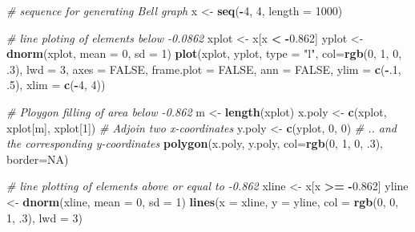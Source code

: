 \documentclass[]{article}
\newenvironment{Shaded}{\begin{snugshade}}{\end{snugshade}}
\newcommand{\KeywordTok}[1]{\textcolor[rgb]{0.13,0.29,0.53}{\textbf{#1}}}
\newcommand{\DataTypeTok}[1]{\textcolor[rgb]{0.13,0.29,0.53}{#1}}
\newcommand{\DecValTok}[1]{\textcolor[rgb]{0.00,0.00,0.81}{#1}}
\newcommand{\FloatTok}[1]{\textcolor[rgb]{0.00,0.00,0.81}{#1}}
\newcommand{\StringTok}[1]{\textcolor[rgb]{0.31,0.60,0.02}{#1}}
\newcommand{\CommentTok}[1]{\textcolor[rgb]{0.56,0.35,0.01}{\textit{#1}}}
\newcommand{\OtherTok}[1]{\textcolor[rgb]{0.56,0.35,0.01}{#1}}
\newcommand{\OperatorTok}[1]{\textcolor[rgb]{0.81,0.36,0.00}{\textbf{#1}}}
\newcommand{\NormalTok}[1]{#1}
\begin{document}
\begin{Shaded}
\begin{Highlighting}[]
\CommentTok{# sequence for generating Bell graph}
\NormalTok{x <-}\StringTok{ }\KeywordTok{seq}\NormalTok{(}\OperatorTok{-}\DecValTok{4}\NormalTok{, }\DecValTok{4}\NormalTok{, }\DataTypeTok{length =} \DecValTok{1000}\NormalTok{)}

\CommentTok{# line ploting of elements below -0.0862}
\NormalTok{xplot <-}\StringTok{ }\NormalTok{x[x }\OperatorTok{<}\StringTok{ }\OperatorTok{-}\FloatTok{0.862}\NormalTok{]}
\NormalTok{yplot <-}\StringTok{ }\KeywordTok{dnorm}\NormalTok{(xplot, }\DataTypeTok{mean =} \DecValTok{0}\NormalTok{, }\DataTypeTok{sd =} \DecValTok{1}\NormalTok{)}
\KeywordTok{plot}\NormalTok{(xplot, yplot, }\DataTypeTok{type =} \StringTok{"l"}\NormalTok{, }\DataTypeTok{col=}\KeywordTok{rgb}\NormalTok{(}\DecValTok{0}\NormalTok{, }\DecValTok{1}\NormalTok{, }\DecValTok{0}\NormalTok{, .}\DecValTok{3}\NormalTok{), }\DataTypeTok{lwd =} \DecValTok{3}\NormalTok{, }\DataTypeTok{axes =} \OtherTok{FALSE}\NormalTok{, }\DataTypeTok{frame.plot =} \OtherTok{FALSE}\NormalTok{, }\DataTypeTok{ann =} \OtherTok{FALSE}\NormalTok{, }\DataTypeTok{ylim =} \KeywordTok{c}\NormalTok{(}\OperatorTok{-}\NormalTok{.}\DecValTok{1}\NormalTok{, .}\DecValTok{5}\NormalTok{), }\DataTypeTok{xlim =} \KeywordTok{c}\NormalTok{(}\OperatorTok{-}\DecValTok{4}\NormalTok{, }\DecValTok{4}\NormalTok{))}

\CommentTok{# Ploygon filling of area below -0.862}
\NormalTok{m <-}\StringTok{ }\KeywordTok{length}\NormalTok{(xplot)                         }
\NormalTok{x.poly <-}\StringTok{ }\KeywordTok{c}\NormalTok{(xplot, xplot[m], xplot[}\DecValTok{1}\NormalTok{])        }\CommentTok{# Adjoin two x-coordinates}
\NormalTok{y.poly <-}\StringTok{ }\KeywordTok{c}\NormalTok{(yplot, }\DecValTok{0}\NormalTok{, }\DecValTok{0}\NormalTok{)                      }\CommentTok{# .. and the corresponding y-coordinates}
\KeywordTok{polygon}\NormalTok{(x.poly, y.poly, }\DataTypeTok{col=}\KeywordTok{rgb}\NormalTok{(}\DecValTok{0}\NormalTok{, }\DecValTok{1}\NormalTok{, }\DecValTok{0}\NormalTok{, .}\DecValTok{3}\NormalTok{), }\DataTypeTok{border=}\OtherTok{NA}\NormalTok{)}

\CommentTok{# line plotting of elements above or equal to -0.862 }
\NormalTok{xline <-}\StringTok{ }\NormalTok{x[x }\OperatorTok{>=}\StringTok{ }\OperatorTok{-}\FloatTok{0.862}\NormalTok{]}
\NormalTok{yline <-}\StringTok{ }\KeywordTok{dnorm}\NormalTok{(xline, }\DataTypeTok{mean =} \DecValTok{0}\NormalTok{, }\DataTypeTok{sd =} \DecValTok{1}\NormalTok{)}
\KeywordTok{lines}\NormalTok{(}\DataTypeTok{x =}\NormalTok{ xline, }\DataTypeTok{y =}\NormalTok{ yline, }\DataTypeTok{col =} \KeywordTok{rgb}\NormalTok{(}\DecValTok{0}\NormalTok{, }\DecValTok{0}\NormalTok{, }\DecValTok{1}\NormalTok{, .}\DecValTok{3}\NormalTok{), }\DataTypeTok{lwd =} \DecValTok{3}\NormalTok{)}


\end{Highlighting}
\end{Shaded}
\end{document}
